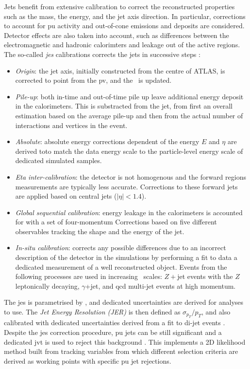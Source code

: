 Jets benefit from extensive calibration to correct the reconstructed properties such as the mass, the energy, and the jet axis direction. In particular, corrections to account for \gls{pu} activity and out-of-cone emissions and deposits are considered. Detector effects are also taken into account, such as differences between the electromagnetic and hadronic calorimters and leakage out of the active regions. The so-called \textit{\gls{jes}} calibrations corrects the jets in successive steps \cite{ATLASjesjerMeas}: 
\begin{itemize}[leftmargin=*]
\item \textit{Origin}: the jet axis, initially constructed from the centre of ATLAS, is corrected to point from the \gls{pv}, and the \pt\ is updated.
\item \textit{Pile-up}: both in-time and out-of-time pile up leave additional energy deposit in the calorimeters. This is substracted from the jet, from first an overall estimation based on the average pile-up and then from the actual number of interactions and vertices in the event. 
\item \textit{Absolute}: absolute energy corrections dependent of the energy $E$ and $\eta$ are derived toto match the data energy scale to the particle-level energy scale of dedicated simulated samples.
\item \textit{Eta inter-calibration}: the detector is not homogenous and the forward regions measurements are typically less accurate. Corrections to these forward jets are applied based on central jets ($|\eta|<1.4$).
\item \textit{Global sequential calibration}: energy leakage in the calorimeters is accounted for with a set of four-momentum Corrections based on five different observables tracking the shape and the energy of the jet.  
\item \textit{In-situ calibration}: corrects any possible differences due to an incorrect description of the detector in the simulations by performing a fit to data a dedicated measurement of a well reconstructed object. Events from the following processes are used in increasing \pt\ scales: $Z+$jet events with the $Z$ leptonically decaying, $\gamma$+jet, and \gls{qcd} multi-jet events at high momentum.
\end{itemize}
The \gls{jes} is parametrised by \pt, and dedicated uncertainties are derived for analyses to use. The \textit{Jet Energy Resolution (JER)} is then defined as $\sigma_{p_T}/p_T$, and also calibrated with dedicated uncertainties derived from a fit to di-jet events \cite{ATLASjesjerMeas}. Despite the \gls{jes} correction procedure, \gls{pu} jets can be still significant and a dedicated \gls{jvt} is used to reject this background \cite{ATLAS-CONF-2014-018}. This implements a 2D likelihood method built from tracking variables from which different selection criteria are derived as working points with specific \gls{pu} jet rejections. 

